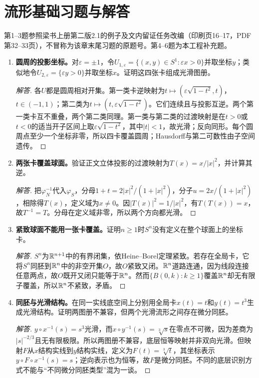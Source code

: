 \section{流形基础习题与解答}
第1--3题参照梁书上册第二版2.1的例子及文内留证任务改编（印刷页16--17，PDF第32--33页），不冒称为该章末尾习题的原题号。第4--6题为本工程补充题。
\begin{enumerate}[label=\textbf{3.\arabic*.},ref=3.\arabic*,leftmargin=*]
\item \textbf{圆周的投影坐标。}对$\varepsilon=\pm1$，令$U_{1,\varepsilon}=\{(x,y)\in S^1:\varepsilon x>0\}$并取坐标$y$；类似地令$U_{2,\varepsilon}=\{\varepsilon y>0\}$并取坐标$x$。证明这四张卡组成光滑图册。
\begin{proof}[解答]
各$U$都是圆周相对开集。第一类卡逆映射为$t\mapsto(\varepsilon\sqrt{1-t^2},t)$，$t\in(-1,1)$；第二类为$t\mapsto(t,\varepsilon\sqrt{1-t^2})$。它们连续且与投影互逆。两个第一类卡互不重叠，两个第二类同理。第一类与第二类的过渡映射是在$t>0$或$t<0$的适当开子区间上取$\varepsilon\sqrt{1-t^2}$，其中$|t|<1$，故光滑；反向同形。每个圆周点至少一个坐标非零，所以四卡覆盖圆周；Hausdorff与第二可数性由子空间遗传。
\end{proof}
\item \textbf{两张卡覆盖球面。}验证正文立体投影的过渡映射为$T(x)=x/|x|^2$，并计算其逆。
\begin{proof}[解答]
把$\varphi_N^{-1}$代入$\varphi_S$，分母$1+t=2|x|^2/(1+|x|^2)$，分子$u=2x/(1+|x|^2)$，相除得$T(x)$，定义域为$x\ne0$。因$|T(x)|^2=1/|x|^2$，有$T(T(x))=x$，故$T^{-1}=T$。分母在定义域非零，所以两个方向都光滑。
\end{proof}
\item \textbf{紧致球面不能用一张卡覆盖。}证明$n\geq1$时$S^n$没有定义在整个球面上的坐标卡。
\begin{proof}[解答]
$S^n$为$\mathbb{R}^{n+1}$中的有界闭集，依Heine--Borel定理紧致。若存在全局卡，它将$S^n$同胚到$\mathbb{R}^n$中的非空开集$O$，故$O$紧致又闭。$\mathbb{R}^n$道路连通，因为线段连接任意两点，故$O$既开又闭只能等于$\mathbb{R}^n$。然而$\{B(0,k):k\geq1\}$覆盖$\mathbb{R}^n$却无有限子覆盖，所以$\mathbb{R}^n$不紧致，矛盾。
\end{proof}
\item \textbf{同胚与光滑结构。}在同一实线底空间上分别用全局卡$x(t)=t$和$y(t)=t^3$生成光滑结构。证明两图册不兼容，但两个光滑流形之间存在微分同胚。
\begin{proof}[解答]
$y\circ x^{-1}(s)=s^3$光滑，而$x\circ y^{-1}(s)=\sqrt[3]s$在零点不可微，因为差商为$|s|^{-2/3}$且无有限极限。所以两图册不兼容，底层恒等映射并非双向光滑。但映射$F$从$x$结构实线到$y$结构实线，定义为$F(t)=\sqrt[3]t$，其坐标表示$y\circ F\circ x^{-1}(s)=s$；逆向表示也为恒等，故$F$是微分同胚。不同的底层识别方式不能与“不同微分同胚类型”混为一谈。

\end{proof}
\end{enumerate}
